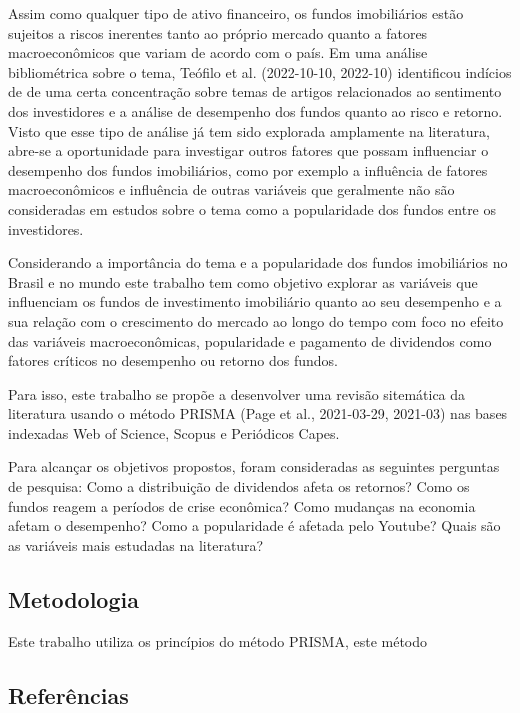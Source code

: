 \documentclass[
  12pt,
  letterpaper,
  DIV=11,
  numbers=noendperiod]{scrartcl}
\begin{document}
Assim como qualquer tipo de ativo financeiro, os fundos imobiliários
estão sujeitos a riscos inerentes tanto ao próprio mercado quanto a
fatores macroeconômicos que variam de acordo com o país. Em uma análise
bibliométrica sobre o tema, Teófilo et al. (2022-10-10, 2022-10)
identificou indícios de de uma certa concentração sobre temas de artigos
relacionados ao sentimento dos investidores e a análise de desempenho
dos fundos quanto ao risco e retorno. Visto que esse tipo de análise já
tem sido explorada amplamente na literatura, abre-se a oportunidade para
investigar outros fatores que possam influenciar o desempenho dos fundos
imobiliários, como por exemplo a influência de fatores macroeconômicos e
influência de outras variáveis que geralmente não são consideradas em
estudos sobre o tema como a popularidade dos fundos entre os
investidores.

Considerando a importância do tema e a popularidade dos fundos
imobiliários no Brasil e no mundo este trabalho tem como objetivo
explorar as variáveis que influenciam os fundos de investimento
imobiliário quanto ao seu desempenho e a sua relação com o crescimento
do mercado ao longo do tempo com foco no efeito das variáveis
macroeconômicas, popularidade e pagamento de dividendos como fatores
críticos no desempenho ou retorno dos fundos.

Para isso, este trabalho se propõe a desenvolver uma revisão sitemática
da literatura usando o método PRISMA (Page et al., 2021-03-29, 2021-03)
nas bases indexadas Web of Science, Scopus e Periódicos Capes.

Para alcançar os objetivos propostos, foram consideradas as seguintes
perguntas de pesquisa: Como a distribuição de dividendos afeta os
retornos? Como os fundos reagem a períodos de crise econômica? Como
mudanças na economia afetam o desempenho? Como a popularidade é afetada
pelo Youtube? Quais são as variáveis mais estudadas na literatura?

\subsection{Metodologia}\label{metodologia}

Este trabalho utiliza os princípios do método PRISMA, este método

\subsection*{Referências}\label{referuxeancias}
\end{document}
